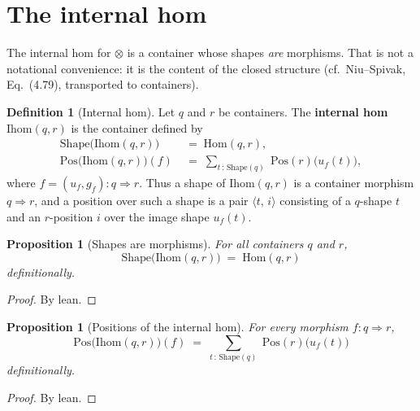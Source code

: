 \documentclass[11pt,a4paper]{article}
\theoremstyle{plain}
\newtheorem{proposition}[theorem]{Proposition}
\theoremstyle{definition}
\newtheorem{definition}[theorem]{Definition}
\newcommand{\Shape}{\mathrm{Shape}}
\newcommand{\Pos}{\mathrm{Pos}}
\newcommand{\Ihom}{\mathrm{Ihom}}
\newcommand{\Hom}{\mathrm{Hom}}
\begin{document}
\section{The internal hom}

The internal hom for $\otimes$ is a container whose shapes \emph{are}
morphisms. That is not a notational convenience: it is the content of the
closed structure (cf.\ Niu--Spivak, Eq.~(4.79), transported to containers).

\begin{definition}[Internal hom]\label{def:ihom}
Let $q$ and $r$ be containers. The \textbf{internal hom}
$\Ihom(q,r)$ is the container defined by
\begin{align}
  \Shape\bigl(\Ihom(q,r)\bigr)
  &\;=\;
  \Hom(q,r), \\[4pt]
  \Pos\bigl(\Ihom(q,r)\bigr)(f)
  &\;=\;
  \sum_{t \,:\, \Shape(q)}\;
  \Pos(r)\bigl(u_f(t)\bigr),
\end{align}
where $f = (u_f, g_f) : q \Rightarrow r$. Thus a shape of $\Ihom(q,r)$ is a
container morphism $q \Rightarrow r$, and a position over such a shape is a
pair $\langle t,\, i \rangle$ consisting of a $q$-shape $t$ and an
$r$-position $i$ over the image shape $u_f(t)$.
\end{definition}

\begin{proposition}[Shapes are morphisms]\label{prop:ihom-shape}
For all containers $q$ and $r$,
\begin{equation}
  \Shape\bigl(\Ihom(q,r)\bigr) \;=\; \Hom(q,r)
\end{equation}
definitionally.
\end{proposition}

\begin{proof}
By lean.
\end{proof}

\begin{proposition}[Positions of the internal hom]\label{prop:ihom-pos}
For every morphism $f : q \Rightarrow r$,
\begin{equation}
  \Pos\bigl(\Ihom(q,r)\bigr)(f)
  \;=\;
  \sum_{t \,:\, \Shape(q)}\; \Pos(r)\bigl(u_f(t)\bigr)
\end{equation}
definitionally.
\end{proposition}

\begin{proof}
By lean.
\end{proof}
\end{document}
